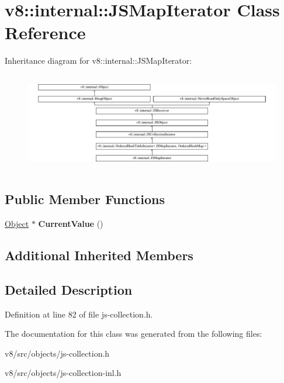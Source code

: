 \hypertarget{classv8_1_1internal_1_1JSMapIterator}{}\section{v8\+:\+:internal\+:\+:J\+S\+Map\+Iterator Class Reference}
\label{classv8_1_1internal_1_1JSMapIterator}
Inheritance diagram for v8\+:\+:internal\+:\+:J\+S\+Map\+Iterator\+:\begin{figure}[H]
\begin{center}
\leavevmode
\includegraphics[height=4.345898cm]{classv8_1_1internal_1_1JSMapIterator}
\end{center}
\end{figure}
\subsection*{Public Member Functions}
\begin{DoxyCompactItemize}
\item 
\mbox{\label{classv8_1_1internal_1_1JSMapIterator_a8087d385de3547ffb88bfd91786630c7}} 
\mbox{\hyperlink{classv8_1_1internal_1_1Object}{Object}} $\ast$ {\bfseries Current\+Value} ()
\end{DoxyCompactItemize}
\subsection*{Additional Inherited Members}


\subsection{Detailed Description}


Definition at line 82 of file js-\/collection.\+h.



The documentation for this class was generated from the following files\+:\begin{DoxyCompactItemize}
\item 
v8/src/objects/js-\/collection.\+h\item 
v8/src/objects/js-\/collection-\/inl.\+h\end{DoxyCompactItemize}
